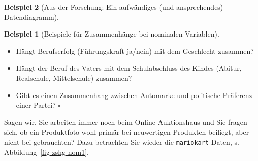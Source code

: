 \documentclass[
  a4paper,
]{scrbook}
\providecommand{\tightlist}{%
  \setlength{\itemsep}{0pt}\setlength{\parskip}{0pt}}\usepackage{longtable,booktabs,array}
\theoremstyle{definition}
\newtheorem{example}{Beispiel}[chapter]
\theoremstyle{definition}
\theoremstyle{definition}
\theoremstyle{remark}
\begin{document}
\begin{example}[Aus der Forschung: Ein aufwändiges (und ansprechendes)
Datendiagramm]
\begin{example}[Beispiele für Zusammenhänge bei nominalen
Variablen]
~

\begin{itemize}
\tightlist
\item
  Hängt Berufserfolg (Führungskraft ja/nein) mit dem Geschlecht
  zusammen?
\item
  Hängt der Beruf des Vaters mit dem Schulabschluss des Kindes (Abitur,
  Realschule, Mittelschule) zusammen?
\item
  Gibt es einen Zusammenhang zwischen Automarke und politische Präferenz
  einer Partei? \(\square\)
\end{itemize}

\end{example}

Sagen wir, Sie arbeiten immer noch beim Online-Auktionshaus und Sie
fragen sich, ob ein Produktfoto wohl primär bei neuwertigen Produkten
beiliegt, aber nicht bei gebrauchten? Dazu betrachten Sie wieder die
\texttt{mariokart}-Daten, s. Abbildung~\ref{fig-zshg-nom1}.

\begin{figure}

\begin{minipage}{0.50\linewidth}



\end{minipage}%
%
\begin{minipage}{0.50\linewidth}

\centering{

}
\end{minipage}
\end{figure}
\end{example}
\end{document}
